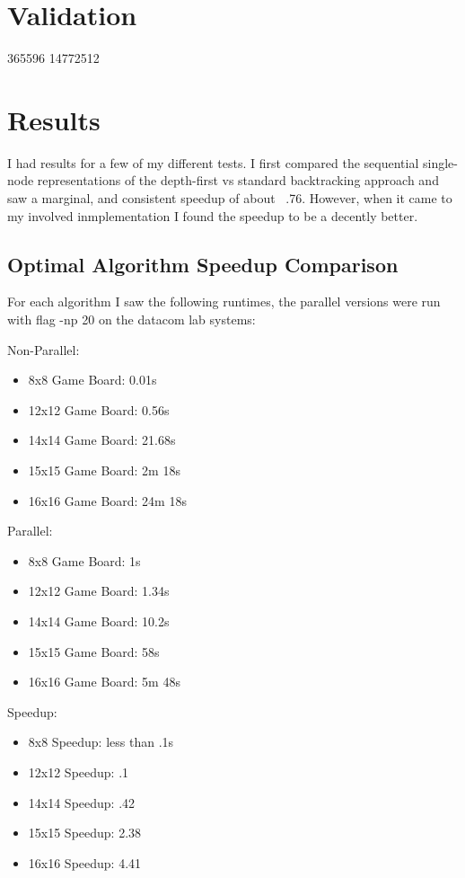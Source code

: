 \documentclass[11pt]{article}
\begin{document}
\section{Validation}
365596
14772512
\section{Results}
I had results for a few of my different tests. I first compared the sequential single-node representations of the depth-first vs standard backtracking approach and saw a marginal, and consistent speedup of about ~.76. However, when it came to my involved inmplementation I found the speedup to be a decently better.
\subsection{Optimal Algorithm Speedup Comparison}
For each algorithm I saw the following runtimes, the parallel versions were run with flag -np 20 on the datacom lab systems:

Non-Parallel:
\begin{itemize}
  \item 8x8 Game Board: 0.01s
  \item 12x12 Game Board: 0.56s
  \item 14x14 Game Board: 21.68s
  \item 15x15 Game Board: 2m 18s
  \item 16x16 Game Board: 24m 18s
\end{itemize}

Parallel:
\begin{itemize}
  \item 8x8 Game Board: 1s
  \item 12x12 Game Board: 1.34s
  \item 14x14 Game Board: 10.2s
  \item 15x15 Game Board: 58s
  \item 16x16 Game Board: 5m 48s
\end{itemize}

Speedup:
\begin{itemize}
\item 8x8 Speedup: less than .1s
  \item 12x12 Speedup: .1
  \item 14x14 Speedup: .42
  \item 15x15 Speedup: 2.38
  \item 16x16 Speedup: 4.41
\end{itemize}
\end{document}
